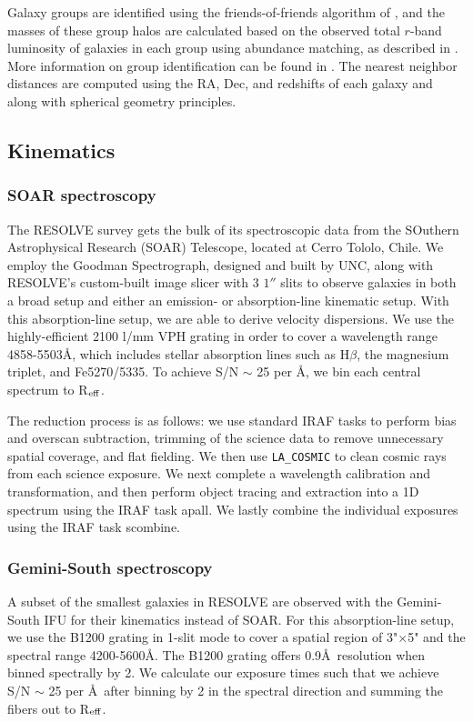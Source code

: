 \documentclass[iop,apj]{emulateapj}
\newcommand{\Reff}{R$_{\rm eff}$}
\begin{document}
Galaxy groups are identified using the friends-of-friends algorithm of \citet{Berlind2006}, and the masses of these group halos are calculated based on the observed total $r$-band luminosity of galaxies in each group using abundance matching, as described in \citet{Blanton2007}. More information on group identification can be found in \citet{Moffett2015}. The nearest neighbor distances are computed using the RA, Dec, and redshifts of each galaxy and along with spherical geometry principles. 

\subsection{Kinematics}
\label{kin}

\subsubsection{SOAR spectroscopy}
\noindent The RESOLVE survey gets the bulk of its spectroscopic data from the SOuthern Astrophysical Research (SOAR) Telescope, located at Cerro Tololo, Chile. We employ the Goodman Spectrograph, designed and built by UNC, along with RESOLVE's custom-built image slicer with 3 $1''$ slits to observe galaxies in both a broad setup and either an emission- or absorption-line kinematic setup. With this absorption-line setup, we are able to derive velocity dispersions. We use the highly-efficient 2100 l/mm VPH grating in order to cover a wavelength range 4858-5503\AA, which includes stellar absorption lines such as H$\beta$, the magnesium triplet, and Fe5270/5335. To achieve S/N $\sim$ 25 per \AA, we bin each central spectrum to \Reff.

The reduction process is as follows: we use standard IRAF tasks to perform bias and overscan subtraction, trimming of the science data to remove unnecessary spatial coverage, and flat fielding. We then use \texttt{LA\_COSMIC} \citep{vanDokkum2001} to clean cosmic rays from each science exposure. We next complete a wavelength calibration and transformation, and then perform object tracing and extraction into a 1D spectrum using the IRAF task apall. We lastly combine the individual exposures using the IRAF task scombine.

\subsubsection{Gemini-South spectroscopy}

\noindent A subset of the smallest galaxies in RESOLVE are observed with the Gemini-South IFU for their kinematics instead of SOAR. For this absorption-line setup, we use the B1200 grating in 1-slit mode to cover a spatial region of 3"$\times$5" and the spectral range 4200-5600\AA. The B1200 grating offers 0.9\AA\ resolution when binned spectrally by 2. We calculate our exposure times such that we achieve S/N $\sim$ 25 per \AA\, after binning by 2 in the spectral direction and summing the fibers out to \Reff.
\end{document}

